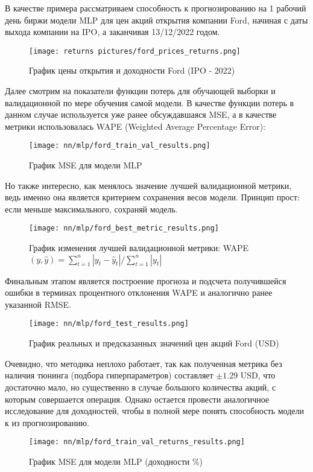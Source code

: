 В качестве примера рассматриваем способность к прогнозированию на 1 рабочий день биржи модели MLP для цен акций открытия компании Ford, начиная с даты выхода компании на IPO, а заканчивая 13/12/2022 годом.
\begin{figure}[H]
	\centering
	\texttt{[image: returns pictures/ford\_prices\_returns.png]}
	\caption{График цены открытия и доходности Ford (IPO - 2022)}
	\label{fig::ford_prices_returns}
\end{figure}
Далее смотрим на показатели функции потерь для обучающей выборки и валидационной по мере обучения самой модели. В качестве функции потерь в данном случае используется уже ранее обсуждавшаяся MSE, а в качестве метрики использовалась WAPE (Weighted Average Percentage Error):
\begin{figure}[H]
	\centering
	\texttt{[image: nn/mlp/ford\_train\_val\_results.png]}
	\caption{График MSE для модели MLP}
	\label{fig::ford_train_val_results}
\end{figure}
Но также интересно, как менялось значение лучшей валидационной метрики, ведь именно она является критерием сохранения весов модели. Принцип прост: если меньше максимального, сохраняй модель.
\begin{figure}[H]
	\centering
	\texttt{[image: nn/mlp/ford\_best\_metric\_results.png]}
	\caption{График изменения лучшей валидационной метрики: WAPE$(y, \hat{y}) = \sum_{t = 1}^n |y_t - \hat{y}_t| / \sum_{t = 1}^n |y_t|$}
	\label{fig::ford_train_best_metric_results}
\end{figure}
Финальным этапом является построение прогноза и подсчета получившейся ошибки в терминах процентного отклонения WAPE и аналогично ранее указанной RMSE.
\begin{figure}[H]
	\centering
	\texttt{[image: nn/mlp/ford\_test\_results.png]}
	\caption{График реальных и предсказанных значений цен акций Ford (USD)}
	\label{fig::ford_test_results}
\end{figure}
Очевидно, что методика неплохо работает, так как полученная метрика без наличия тюнинга (подбора гиперпараметров) составляет $\pm 1.29$ USD, что достаточно мало, но существенно в случае большого количества акций, с которым совершается операция. Однако остается провести аналогичное исследование для доходностей, чтобы в полной мере понять способность модели к из прогнозированию.
\begin{figure}[H]
	\centering
	\texttt{[image: nn/mlp/ford\_train\_val\_returns\_results.png]}
	\caption{График MSE для модели MLP (доходности \%)}
	\label{fig::ford_train_val_returns_results}
\end{figure}
